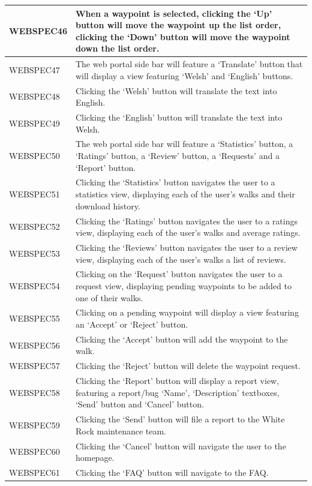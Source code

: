 \documentclass[11pt,a4paper]{article}
\begin{document}
\begin{longtable}{|p{2.5cm}p{13cm}|}
WEBSPEC46 & When a waypoint is selected, clicking the `Up' button will move the waypoint up the list order, clicking the `Down' button will move the waypoint down the list order. \\ \hline
WEBSPEC47 & The web portal side bar will feature a `Translate' button that will display a view featuring `Welsh' and `English' buttons. \\ \hline
WEBSPEC48 & Clicking the `Welsh' button will translate the text into English. \\ \hline
WEBSPEC49 & Clicking the `English' button will translate the text into Welsh. \\ \hline
WEBSPEC50 & The web portal side bar will feature a `Statistics' button, a `Ratings' button, a `Review' button, a `Requests' and a `Report' button. \\ \hline
WEBSPEC51 & Clicking the `Statistics' button navigates the user to a statistics view, displaying each of the user's walks and their download history. \\ \hline
WEBSPEC52 & Clicking the `Ratings' button navigates the user to a ratings view, displaying each of the user's walks and average ratings. \\ \hline
WEBSPEC53 & Clicking the `Reviews' button navigates the user to a review view, displaying each of the user's walks a list of reviews. \\ \hline
WEBSPEC54 & Clicking on the `Request' button navigates the user to a request view, displaying pending waypoints to be added to one of their walks. \\ \hline
WEBSPEC55 & Clicking on a pending waypoint will display a view featuring an `Accept' or `Reject' button. \\ \hline
WEBSPEC56 & Clicking the `Accept' button will add the waypoint to the walk. \\ \hline
WEBSPEC57 & Clicking the `Reject' button will delete the waypoint request. \\ \hline
WEBSPEC58 & Clicking the `Report' button will display a report view, featuring a report/bug `Name', `Description' textboxes, `Send' button and `Cancel' button. \\ \hline
WEBSPEC59 & Clicking the `Send' button will file a report to the White Rock maintenance team. \\ \hline
WEBSPEC60 & Clicking the `Cancel' button will navigate the user to the homepage. \\ \hline
WEBSPEC61 & Clicking the `FAQ' button will navigate to the FAQ. \\ \hline

\end{longtable}
\end{document}
